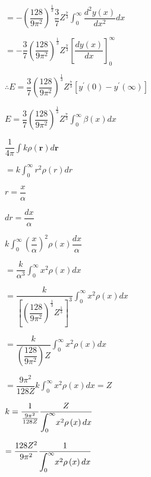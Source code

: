 \documentclass{jarticle}%
\begin{document}
$=-\left(  \dfrac{128}{9\pi^{2}}\right)  ^{\frac{1}{3}}\dfrac{3}{7}Z^{\frac
{7}{3}}%
{\displaystyle\int_{0}^{\infty}}
\dfrac{d^{2}y\left(  x\right)  }{dx^{2}}dx$

$=-\dfrac{3}{7}\left(  \dfrac{128}{9\pi^{2}}\right)  ^{\frac{1}{3}}Z^{\frac
{7}{3}}\left[  \dfrac{dy\left(  x\right)  }{dx}\right]  _{0}^{\infty}$

$\therefore E=\dfrac{3}{7}\left(  \dfrac{128}{9\pi^{2}}\right)  ^{\frac{1}{3}%
}Z^{\frac{7}{3}}\left[  y^{\prime}\left(  0\right)  -y^{\prime}\left(
\infty\right)  \right]  $

$E=\dfrac{3}{7}\left(  \dfrac{128}{9\pi^{2}}\right)  ^{\frac{1}{3}}Z^{\frac
{7}{3}}%
{\displaystyle\int_{0}^{\infty}}
\beta\left(  x\right)  dx$

$\dfrac{1}{4\pi}%
{\displaystyle\int}
k\rho\left(  \mathbf{r}\right)  d\mathbf{r}$

$=k%
{\displaystyle\int_{0}^{\infty}}
r^{2}\rho\left(  r\right)  dr$

$r=\dfrac{x}{\alpha}$

$dr=\dfrac{dx}{\alpha}$

$k%
{\displaystyle\int_{0}^{\infty}}
\left(  \dfrac{x}{\alpha}\right)  ^{2}\rho\left(  x\right)  \dfrac{dx}{\alpha
}$

$=\dfrac{k}{\alpha^{3}}%
{\displaystyle\int_{0}^{\infty}}
x^{2}\rho\left(  x\right)  dx$

$=\dfrac{k}{\left[  \left(  \dfrac{128}{9\pi^{2}}\right)  ^{\frac{1}{3}%
}Z^{\frac{1}{3}}\right]  ^{3}}%
{\displaystyle\int_{0}^{\infty}}
x^{2}\rho\left(  x\right)  dx$

$=\dfrac{k}{\left(  \dfrac{128}{9\pi^{2}}\right)  Z}%
{\displaystyle\int_{0}^{\infty}}
x^{2}\rho\left(  x\right)  dx$

$=\dfrac{9\pi^{2}}{128Z}k%
{\displaystyle\int_{0}^{\infty}}
x^{2}\rho\left(  x\right)  dx=Z$

$k=\dfrac{1}{\frac{9\pi^{2}}{128Z}}\dfrac{Z}{%
{\displaystyle\int_{0}^{\infty}}
x^{2}\rho\left(  x\right)  dx}$

$=\dfrac{128Z^{2}}{9\pi^{2}}\dfrac{1}{%
{\displaystyle\int_{0}^{\infty}}
x^{2}\rho\left(  x\right)  dx}$
\end{document}
